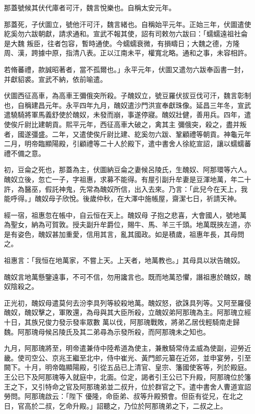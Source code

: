 \begin{pinyinscope}
 那蓋號候其伏代庫者可汗，魏言悅樂也。自稱太安元年。



 那蓋死，子伏圖立，號他汗可汗，魏言緒也。自稱始平元年。正始三年，伏圖遣使紇奚勿六跋朝獻，請求通和。宣武不報其使，詔有司敕勿六跋曰：「蠕蠕遠祖社侖是大魏
 叛臣，往者包容，暫時通使。今蠕蠕衰微，有損疇日；大魏之德，方隆周、漢，跨據中原，指清八表。正以江南未平，權寬北略。通和之事，未容相許。



 若脩蕃禮，款誠昭著者，當不孤爾也。」永平元年，伏圖又遣勿六跋奉函書一封，并獻貂裘。宣武不納，依前喻遣。



 伏圖西征高車，為高車王彌俄突所殺。子醜奴立，號豆羅伏拔豆伐可汗，魏言彰制也，自稱建昌元年。永平四年九月，醜奴遣沙門洪宣奉獻珠像。延昌三年冬，宣武遣驍騎將軍馬義舒使於醜奴，未發而崩，事遂停寢。醜奴壯健，善用兵。四年，遣使俟斤尉比建朝貢。熙平元年，西征高車大破之，禽其主
 彌俄突，殺之，盡并叛者，國遂彊盛。二年，又遣使俟斤尉比建、紇奚勿六跋、鞏顧禮等朝貢。神龜元年二月，明帝臨顯陽殿，引顧禮等二十人於殿下，遣中書舍人徐紇宣詔，讓以蠕蠕蕃禮不備之意。



 初，豆侖之死也，那蓋為主，伏圖納豆侖之妻候呂陵氏，生醜奴、阿那環等六人。醜奴立後，忽亡一子，字祖惠，求募不能得。有屋引副升牟妻是豆渾地萬，年二十許，為醫巫，假託神鬼，先常為醜奴所信，出入去來。乃言：「此兒今在天上，我能呼得。」醜奴母子欣悅。後歲仲秋，在大澤中施帳屋，齋潔七日，祈請天神。



 經一宿，祖惠忽在帳中，自云恒在天上。醜奴母
 子抱之悲喜，大會國人，號地萬為聖女，納為可賀敦。授夫副升牟爵位，賜牛、馬、羊三千頭。地萬既挾左道，亦是有姿色，醜奴甚加重愛，信用其言，亂其國政。如是積歲，祖惠年長，其母問之。



 祖惠言：「我恒在地萬家，不嘗上天。上天者，地萬教也。」其母具以狀告醜奴。



 醜奴言地萬懸鑒遠事，不可不信，勿用讒言也。既而地萬恐懼，譖祖惠於醜奴，醜奴陰殺之。



 正光初，醜奴母遣莫何去汾李具列等絞殺地萬。醜奴怒，欲誅具列等。又阿至羅侵醜奴，醜奴擊之，軍敗還，為母與其大臣所殺，立醜奴弟阿那瑰為主。阿那瑰立經十日，其族兄俊力發示發率眾數
 萬以伐，阿那瑰戰敗，將弟乙居伐輕騎南走歸魏。阿那瑰母候呂陵氏及其二弟尋為示發所殺，而阿那瑰未之知也。



 九月，阿那瑰將至，明帝遣兼侍中陸希道為使主，兼散騎常侍孟威為使副，迎勞近畿。使司空公、京兆王繼至北中，侍中崔光、黃門郎元纂在近郊，並申宴勞，引至闕下。十月，明帝臨顯陽殿，引從五品已上清官、皇宗、籓國使客等，列於殿庭。王公已下及阿那瑰等入就庭中，北面。位定，謁者引王公已下升殿，阿那瑰位於籓王之下，又引特命之官及阿那瑰弟並二叔升，位於群官之下。遣中書舍人曹道宣詔勞問。阿那瑰啟云：「陛下
 優隆，命臣弟、叔等升殿預會。但臣有從兄，在北之日，官高於二叔，乞命升殿。」詔聽之，乃位於阿那瑰弟之下，二叔之上。




\end{pinyinscope}
